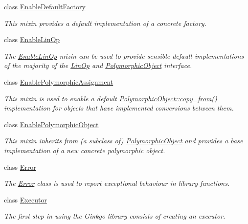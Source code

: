\begin{DoxyCompactItemize}
class \hyperlink{classgko_1_1EnableDefaultFactory}{Enable\+Default\+Factory}
\begin{DoxyCompactList}\small\item\em This mixin provides a default implementation of a concrete factory. \end{DoxyCompactList}\item 
class \hyperlink{classgko_1_1EnableLinOp}{Enable\+Lin\+Op}
\begin{DoxyCompactList}\small\item\em The \hyperlink{classgko_1_1EnableLinOp}{Enable\+Lin\+Op} mixin can be used to provide sensible default implementations of the majority of the \hyperlink{classgko_1_1LinOp}{Lin\+Op} and \hyperlink{classgko_1_1PolymorphicObject}{Polymorphic\+Object} interface. \end{DoxyCompactList}\item 
class \hyperlink{classgko_1_1EnablePolymorphicAssignment}{Enable\+Polymorphic\+Assignment}
\begin{DoxyCompactList}\small\item\em This mixin is used to enable a default \hyperlink{classgko_1_1PolymorphicObject_a5e6f713938293cfbe788d00480eb4d81}{Polymorphic\+Object\+::copy\+\_\+from()} implementation for objects that have implemented conversions between them. \end{DoxyCompactList}\item 
class \hyperlink{classgko_1_1EnablePolymorphicObject}{Enable\+Polymorphic\+Object}
\begin{DoxyCompactList}\small\item\em This mixin inherits from (a subclass of) \hyperlink{classgko_1_1PolymorphicObject}{Polymorphic\+Object} and provides a base implementation of a new concrete polymorphic object. \end{DoxyCompactList}\item 
class \hyperlink{classgko_1_1Error}{Error}
\begin{DoxyCompactList}\small\item\em The \hyperlink{classgko_1_1Error}{Error} class is used to report exceptional behaviour in library functions. \end{DoxyCompactList}\item 
class \hyperlink{classgko_1_1Executor}{Executor}
\begin{DoxyCompactList}\small\item\em The first step in using the Ginkgo library consists of creating an executor. \end{DoxyCompactList}\item 

\end{DoxyCompactItemize}
